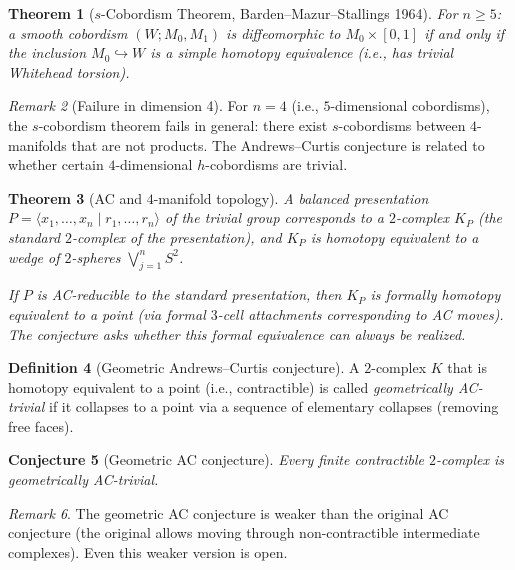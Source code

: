 \documentclass[12pt,a4paper]{amsart}
\newtheorem{theorem}{Theorem}[section]
\newtheorem{conjecture}[theorem]{Conjecture}
\theoremstyle{definition}
\newtheorem{definition}[theorem]{Definition}
\theoremstyle{remark}
\newtheorem{remark}[theorem]{Remark}
\begin{document}
\begin{theorem}[$s$-Cobordism Theorem, Barden--Mazur--Stallings 1964]\label{thm:scobord}
For $n \geq 5$: a smooth cobordism $(W; M_0, M_1)$ is diffeomorphic to
$M_0 \times [0,1]$ if and only if the inclusion $M_0 \hookrightarrow W$ is
a simple homotopy equivalence (i.e., has trivial Whitehead torsion).
\end{theorem}

\begin{remark}[Failure in dimension 4]
For $n = 4$ (i.e., $5$-dimensional cobordisms), the $s$-cobordism theorem fails
in general: there exist $s$-cobordisms between $4$-manifolds that are not products.
The Andrews--Curtis conjecture is related to whether certain $4$-dimensional
$h$-cobordisms are trivial.
\end{remark}

\begin{theorem}[AC and $4$-manifold topology]\label{thm:AC4mfld}
A balanced presentation $P = \langle x_1,\ldots,x_n \mid r_1,\ldots,r_n \rangle$
of the trivial group corresponds to a $2$-complex $K_P$ (the standard $2$-complex
of the presentation), and $K_P$ is homotopy equivalent to a wedge of $2$-spheres
$\bigvee_{j=1}^n S^2$.

If $P$ is AC-reducible to the standard presentation, then $K_P$ is \emph{formally
homotopy equivalent} to a point (via formal $3$-cell attachments corresponding to
AC moves). The conjecture asks whether this formal equivalence can always be realized.
\end{theorem}

\begin{definition}[Geometric Andrews--Curtis conjecture]
A $2$-complex $K$ that is homotopy equivalent to a point (i.e., contractible)
is called \emph{geometrically AC-trivial} if it collapses to a point via a
sequence of elementary collapses (removing free faces).
\end{definition}

\begin{conjecture}[Geometric AC conjecture]\label{conj:geoAC}
Every finite contractible $2$-complex is geometrically AC-trivial.
\end{conjecture}

\begin{remark}
The geometric AC conjecture is weaker than the original AC conjecture (the
original allows moving through non-contractible intermediate complexes).
Even this weaker version is open.
\end{remark}
\end{document}
